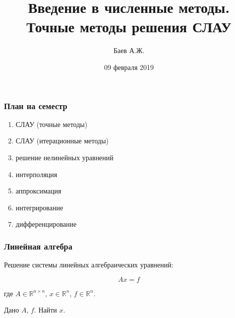 \documentclass[10pt]{beamer}
\author{Баев А.Ж.}
\title{Введение в численные методы. \\ Точные методы решения СЛАУ}
\institute{Казахстанский филиал МГУ}
\date{09 февраля 2019}
\begin{document}
\maketitle


\begin{frame}[fragile]
\frametitle{План на семестр}

\begin{enumerate}
\item СЛАУ (точные методы)
\item СЛАУ (итерационные методы)
\item решение нелинейных уравнений
\item интерполяция 
\item аппроксимация
\item интегрирование
\item дифференцирование
\end{enumerate}

\end{frame}


\begin{frame}[fragile]
\frametitle{Линейная алгебра}

Решение системы линейных алгебраических уравнений:

$$A x = f$$

где $A \in \mathbb{R}^{n \times n}$, $x \in \mathbb{R}^{n}$, $f \in \mathbb{R}^{n}$.

Дано $A$, $f$. Найти $x$.

\end{frame}
\end{document}
